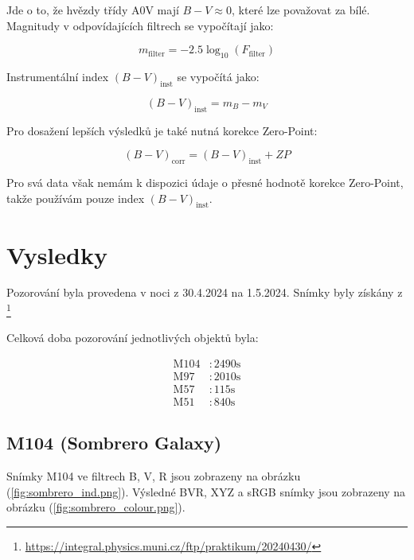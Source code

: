 \documentclass[a4paper,11pt,twocolumn]{article}
\begin{document}
        Jde o to, že hvězdy třídy A0V mají $B-V \approx 0$, které lze považovat za bílé. Magnitudy v odpovídajících filtrech se vypočítají jako: 

        \begin{equation}
            m_{\text{filter}} = -2.5 \log_{10} (F_{\text{filter}})
        \end{equation}

        Instrumentální index $(B-V)_{\text{inst}}$ se vypočítá jako:

        \begin{equation}
            (B-V)_{\text{inst}} = m_B - m_V
        \end{equation}

        Pro dosažení lepších výsledků je také nutná korekce Zero-Point:

        \begin{equation}
            (B-V)_{\text{corr}} = (B-V)_{\text{inst}} + ZP
        \end{equation}

        Pro svá data však nemám k dispozici údaje o přesné hodnotě korekce Zero-Point, takže používám pouze index $(B-V)_{\text{inst}}$. 

    \section{Vysledky}
        Pozorování byla provedena v noci z 30.4.2024 na 1.5.2024. Snímky byly získány z \footnote{\url{https://integral.physics.muni.cz/ftp/praktikum/20240430/}}

        Celková doba pozorování jednotlivých objektů byla:

        \begin{equation*}
            \begin{split}
                \text{M104} & : 2490 \text{s} \\
                \text{M97} & : 2010 \text{s} \\
                \text{M57} & : 115 \text{s} \\
                \text{M51} & : 840 \text{s}
            \end{split}
        \end{equation*}

        \subsection{M104 (Sombrero Galaxy)}
            Snímky M104 ve filtrech B, V, R jsou zobrazeny na obrázku (\ref{fig:sombrero_ind.png}). Výsledné BVR, XYZ a sRGB snímky jsou zobrazeny na obrázku (\ref{fig:sombrero_colour.png}).
\end{document}
